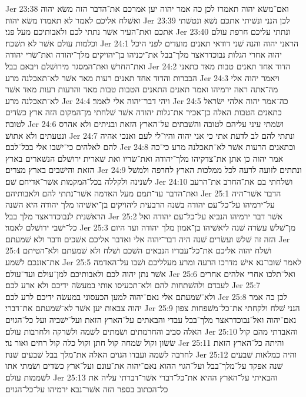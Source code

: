 Jer 23:38  ואם־משׂא יהוה תאמרו לכן כה אמר יהוה יען אמרכם את־הדבר הזה משׂא יהוה ואשׁלח אליכם לאמר לא תאמרו משׂא יהוה׃
Jer 23:39  לכן הנני ונשׁיתי אתכם נשׁא ונטשׁתי אתכם ואת־העיר אשׁר נתתי לכם ולאבותיכם מעל פני׃
Jer 23:40  ונתתי עליכם חרפת עולם וכלמות עולם אשׁר לא תשׁכח׃
Jer 24:1  הראני יהוה והנה שׁני דודאי תאנים מועדים לפני היכל יהוה אחרי הגלות נבוכדראצר מלך־בבל את־יכניהו בן־יהויקים מלך־יהודה ואת־שׂרי יהודה ואת־החרשׁ ואת־המסגר מירושׁלם ויבאם בבל׃
Jer 24:2  הדוד אחד תאנים טבות מאד כתאני הבכרות והדוד אחד תאנים רעות מאד אשׁר לא־תאכלנה מרע׃
Jer 24:3  ויאמר יהוה אלי מה־אתה ראה ירמיהו ואמר תאנים התאנים הטבות טבות מאד והרעות רעות מאד אשׁר לא־תאכלנה מרע׃
Jer 24:4  ויהי דבר־יהוה אלי לאמר׃
Jer 24:5  כה־אמר יהוה אלהי ישׂראל כתאנים הטבות האלה כן־אכיר את־גלות יהודה אשׁר שׁלחתי מן־המקום הזה ארץ כשׂדים לטובה׃
Jer 24:6  ושׂמתי עיני עליהם לטובה והשׁבתים על־הארץ הזאת ובניתים ולא אהרס ונטעתים ולא אתושׁ׃
Jer 24:7  ונתתי להם לב לדעת אתי כי אני יהוה והיו־לי לעם ואנכי אהיה להם לאלהים כי־ישׁבו אלי בכל־לבם׃
Jer 24:8  וכתאנים הרעות אשׁר לא־תאכלנה מרע כי־כה אמר יהוה כן אתן את־צדקיהו מלך־יהודה ואת־שׂריו ואת שׁארית ירושׁלם הנשׁארים בארץ הזאת והישׁבים בארץ מצרים׃
Jer 24:9  ונתתים לזועה לרעה לכל ממלכות הארץ לחרפה ולמשׁל לשׁנינה ולקללה בכל־המקמות אשׁר־אדיחם שׁם׃
Jer 24:10  ושׁלחתי בם את־החרב את־הרעב ואת־הדבר עד־תמם מעל האדמה אשׁר־נתתי להם ולאבותיהם׃
Jer 25:1  הדבר אשׁר־היה על־ירמיהו על־כל־עם יהודה בשׁנה הרבעית ליהויקים בן־יאשׁיהו מלך יהודה היא השׁנה הראשׁנית לנבוכדראצר מלך בבל׃
Jer 25:2  אשׁר דבר ירמיהו הנביא על־כל־עם יהודה ואל כל־ישׁבי ירושׁלם לאמר׃
Jer 25:3  מן־שׁלשׁ עשׂרה שׁנה ליאשׁיהו בן־אמון מלך יהודה ועד היום הזה זה שׁלשׁ ועשׂרים שׁנה היה דבר־יהוה אלי ואדבר אליכם אשׁכים ודבר ולא שׁמעתם׃
Jer 25:4  ושׁלח יהוה אליכם את־כל־עבדיו הנבאים השׁכם ושׁלח ולא שׁמעתם ולא־הטיתם את־אזנכם לשׁמע׃
Jer 25:5  לאמר שׁובו־נא אישׁ מדרכו הרעה ומרע מעלליכם ושׁבו על־האדמה אשׁר נתן יהוה לכם ולאבותיכם למן־עולם ועד־עולם׃
Jer 25:6  ואל־תלכו אחרי אלהים אחרים לעבדם ולהשׁתחות להם ולא־תכעיסו אותי במעשׂה ידיכם ולא ארע לכם׃
Jer 25:7  ולא־שׁמעתם אלי נאם־יהוה למען הכעסוני במעשׂה ידיכם לרע לכם׃
Jer 25:8  לכן כה אמר יהוה צבאות יען אשׁר לא־שׁמעתם את־דברי׃
Jer 25:9  הנני שׁלח ולקחתי את־כל־משׁפחות צפון נאם־יהוה ואל־נבוכדראצר מלך־בבל עבדי והבאתים על־הארץ הזאת ועל־ישׁביה ועל כל־הגוים האלה סביב והחרמתים ושׂמתים לשׁמה ולשׁרקה ולחרבות עולם׃
Jer 25:10  והאבדתי מהם קול שׂשׂון וקול שׂמחה קול חתן וקול כלה קול רחים ואור נר׃
Jer 25:11  והיתה כל־הארץ הזאת לחרבה לשׁמה ועבדו הגוים האלה את־מלך בבל שׁבעים שׁנה׃
Jer 25:12  והיה כמלאות שׁבעים שׁנה אפקד על־מלך־בבל ועל־הגוי ההוא נאם־יהוה את־עונם ועל־ארץ כשׂדים ושׂמתי אתו לשׁממות עולם׃
Jer 25:13  והבאיתי על־הארץ ההיא את־כל־דברי אשׁר־דברתי עליה את כל־הכתוב בספר הזה אשׁר־נבא ירמיהו על־כל־הגוים׃
